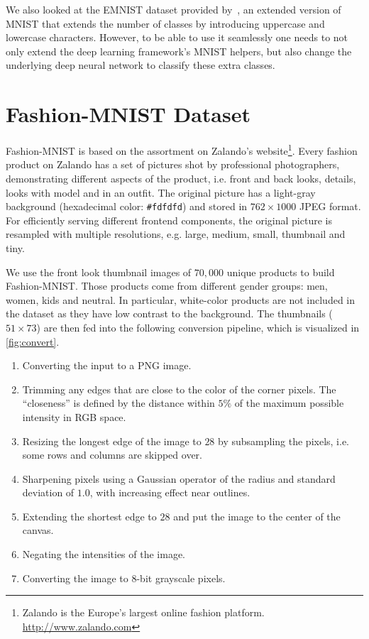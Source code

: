 \documentclass{article}
\newcommand{\fmnist}{Fashion-MNIST\xspace}
\begin{document}
We also looked at the EMNIST dataset provided by~\citet{cohen2017emnist}, an extended version of MNIST that extends the number of classes by introducing uppercase and lowercase characters. However, to be able to use it seamlessly one needs to not only extend the deep learning framework's MNIST helpers, but also change the underlying deep neural network to classify these extra classes. 


\section{\fmnist Dataset\label{sec:dataset}}
\fmnist is based on the assortment on Zalando's website\footnote{Zalando is the Europe's largest online fashion platform. \url{http://www.zalando.com}}. Every fashion product on Zalando has a set of pictures shot by professional photographers, demonstrating different aspects of the product, i.e. front and back looks, details, looks with model and in an outfit. The original picture has a light-gray background (hexadecimal color: \texttt{\#fdfdfd}) and stored in $762\times 1000$ JPEG format. For efficiently serving different frontend components, the original picture is resampled with multiple resolutions, e.g. large, medium, small, thumbnail and tiny. 

We use the front look thumbnail images of $70,000$ unique products to build \fmnist. Those products come from different gender groups: men, women, kids and neutral. In particular, white-color products are not included in the dataset as they have low contrast to the background. The thumbnails ($51\times 73$) are then fed into the following conversion pipeline, which is visualized in \autoref{fig:convert}.

\begin{enumerate}
    \item Converting the input to a PNG image.
    \item Trimming any edges that are close to the color of the corner pixels.
    The ``closeness'' is defined by the distance within $5\%$ of the maximum possible intensity in RGB space.
    \item Resizing the longest edge of the image to $28$ by subsampling the pixels, i.e. some rows and columns
    are skipped over.
    \item Sharpening pixels using a Gaussian operator of the radius and standard deviation of $1.0$, with increasing effect near outlines.
    \item Extending the shortest edge to $28$ and put the image to the center of the canvas.
    \item Negating the intensities of the image.
    \item Converting the image to 8-bit grayscale pixels.
\end{enumerate}
\end{document}
